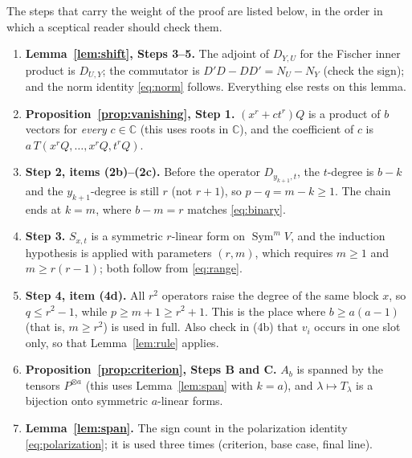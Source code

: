 \documentclass[11pt]{article}
\theoremstyle{definition}
\theoremstyle{remark}
\DeclareMathOperator{\Sym}{Sym}
\newcommand{\C}{\mathbb C}
\newcommand{\D}[2]{D_{#1,#2}}
\begin{document}
The steps that carry the weight of the proof are listed below, in the order
in which a sceptical reader should check them.
\begin{enumerate}[leftmargin=*]
\item \textbf{Lemma~\ref{lem:shift}, Steps 3--5.} The adjoint of $\D YU$ for
the Fischer inner product is $\D UY$; the commutator is
$D'D-DD'=N_U-N_Y$ (check the sign); and the norm identity \eqref{eq:norm}
follows. Everything else rests on this lemma.
\item \textbf{Proposition~\ref{prop:vanishing}, Step 1.} $(x^r+ct^r)Q$ is a
product of $b$ vectors for \emph{every} $c\in\C$ (this uses roots in $\C$),
and the coefficient of $c$ is $a\,T(x^rQ,\ldots,x^rQ,t^rQ)$.
\item \textbf{Step 2, items (2b)--(2c).} Before the operator
$\D{y_{k+1}}{t}$, the $t$-degree is $b-k$ and the $y_{k+1}$-degree is still
$r$ (not $r+1$), so $p-q=m-k\ge1$. The chain ends at $k=m$, where
$b-m=r$ matches \eqref{eq:binary}.
\item \textbf{Step 3.} $S_{x,t}$ is a symmetric $r$-linear form on
$\Sym^mV$, and the induction hypothesis is applied with parameters $(r,m)$,
which requires $m\ge1$ and $m\ge r(r-1)$; both follow from
\eqref{eq:range}.
\item \textbf{Step 4, item (4d).} All $r^2$ operators raise the degree of
the same block $x$, so $q\le r^2-1$, while $p\ge m+1\ge r^2+1$. This is the
place where $b\ge a(a-1)$ (that is, $m\ge r^2$) is used in full. Also check
in (4b) that $v_i$ occurs in one slot only, so that Lemma~\ref{lem:rule}
applies.
\item \textbf{Proposition~\ref{prop:criterion}, Steps B and C.} $A_b$ is
spanned by the tensors $P^{\otimes a}$ (this uses Lemma~\ref{lem:span} with
$k=a$), and $\lambda\mapsto T_\lambda$ is a bijection onto symmetric
$a$-linear forms.
\item \textbf{Lemma~\ref{lem:span}.} The sign count in the polarization
identity \eqref{eq:polarization}; it is used three times (criterion, base
case, final line).
\end{enumerate}
\end{document}

